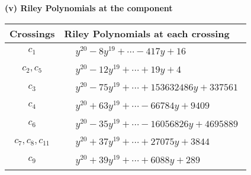 \documentclass[1p]{elsarticle_modified}
\theoremstyle{definition}
\begin{document}
\newpage\renewcommand{\arraystretch}{1}
\flushleft \textbf{(v) Riley Polynomials at the component}\newline \\
\begin{tabular}{m{50pt}|m{274pt}}
Crossings & \hspace{64pt}Riley Polynomials at each crossing \\
\hline $$\begin{aligned}c_{1}\end{aligned}$$&$\begin{aligned}
&y^{20}-8 y^{19}+\cdots-417 y+16
\end{aligned}$\\
\hline $$\begin{aligned}c_{2},c_{5}\end{aligned}$$&$\begin{aligned}
&y^{20}-12 y^{19}+\cdots+19 y+4
\end{aligned}$\\
\hline $$\begin{aligned}c_{3}\end{aligned}$$&$\begin{aligned}
&y^{20}-75 y^{19}+\cdots+153632486 y+337561
\end{aligned}$\\
\hline $$\begin{aligned}c_{4}\end{aligned}$$&$\begin{aligned}
&y^{20}+63 y^{19}+\cdots-66784 y+9409
\end{aligned}$\\
\hline $$\begin{aligned}c_{6}\end{aligned}$$&$\begin{aligned}
&y^{20}-35 y^{19}+\cdots-16056826 y+4695889
\end{aligned}$\\
\hline $$\begin{aligned}c_{7},c_{8},c_{11}\end{aligned}$$&$\begin{aligned}
&y^{20}+37 y^{19}+\cdots+27075 y+3844
\end{aligned}$\\
\hline $$\begin{aligned}c_{9}\end{aligned}$$&$\begin{aligned}
&y^{20}+39 y^{19}+\cdots+6088 y+289
\end{aligned}$\\

\end{tabular}
\end{document}
